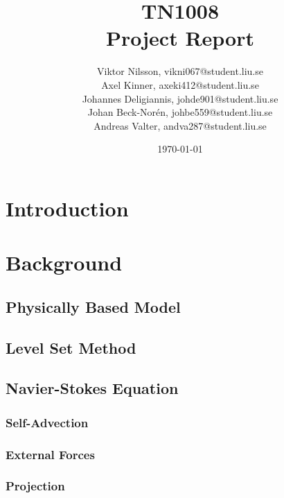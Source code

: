 \documentclass[]{report}   %
\begin{document}
\title{TN1008\\ Project Report}   %
\author{
  Viktor Nilsson, vikni067@student.liu.se 
  \\Axel Kinner, axeki412@student.liu.se
  \\Johannes Deligiannis, johde901@student.liu.se
  \\Johan Beck-Nor\'{e}n, johbe559@student.liu.se
  \\Andreas Valter, andva287@student.liu.se
	}
        \date{\today}    %
        \maketitle
        
\setcounter{page}{2}



\begingroup
\let\clearpage\relax %
\chapter{Introduction}


\chapter{Background}
\section{Physically Based Model}

\section{Level Set Method}

\section{Navier-Stokes Equation}

\subsection{Self-Advection}

\subsection{External Forces}

\subsection{Projection}

\end{document}
